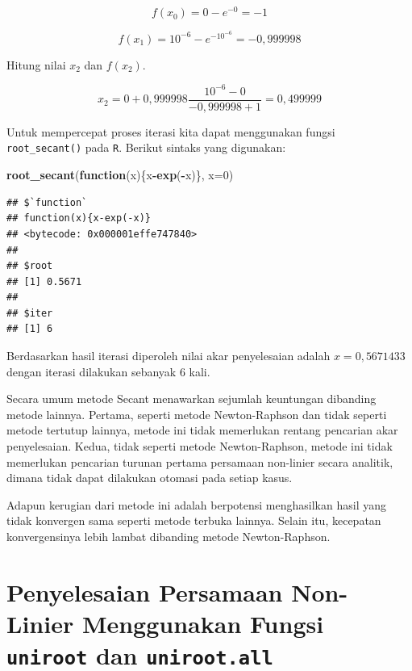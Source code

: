 \documentclass[
]{book}
\newenvironment{Shaded}{\begin{snugshade}}{\end{snugshade}}
\newcommand{\AttributeTok}[1]{\textcolor[rgb]{0.13,0.29,0.53}{#1}}
\newcommand{\ControlFlowTok}[1]{\textcolor[rgb]{0.13,0.29,0.53}{\textbf{#1}}}
\newcommand{\DecValTok}[1]{\textcolor[rgb]{0.00,0.00,0.81}{#1}}
\newcommand{\FunctionTok}[1]{\textcolor[rgb]{0.13,0.29,0.53}{\textbf{#1}}}
\newcommand{\NormalTok}[1]{#1}
\newcommand{\SpecialCharTok}[1]{\textcolor[rgb]{0.81,0.36,0.00}{\textbf{#1}}}
\theoremstyle{definition}
\theoremstyle{definition}
\theoremstyle{definition}
\theoremstyle{definition}
\theoremstyle{remark}
\begin{document}
\[
f\left(x_0 \right)=0-e^{-0}=-1
\]

\[
f\left(x_1 \right)=10^{-6}-e^{-10^{-6}}=-0,999998
\]

Hitung nilai \(x_2\) dan \(f\left(x_2 \right)\).

\[
x_2=0+0,999998\frac{10^{-6}-0}{-0,999998+1}=0,499999
\]

Untuk mempercepat proses iterasi kita dapat menggunakan fungsi \texttt{root\_secant()} pada \texttt{R}. Berikut sintaks yang digunakan:

\begin{Shaded}
\begin{Highlighting}[]
\FunctionTok{root\_secant}\NormalTok{(}\ControlFlowTok{function}\NormalTok{(x)\{x}\SpecialCharTok{{-}}\FunctionTok{exp}\NormalTok{(}\SpecialCharTok{{-}}\NormalTok{x)\}, }\AttributeTok{x=}\DecValTok{0}\NormalTok{)}
\end{Highlighting}
\end{Shaded}

\begin{verbatim}
## $`function`
## function(x){x-exp(-x)}
## <bytecode: 0x000001effe747840>
## 
## $root
## [1] 0.5671
## 
## $iter
## [1] 6
\end{verbatim}

Berdasarkan hasil iterasi diperoleh nilai akar penyelesaian adalah \(x=0,5671433\) dengan iterasi dilakukan sebanyak \(6\) kali.

Secara umum metode Secant menawarkan sejumlah keuntungan dibanding metode lainnya. Pertama, seperti metode Newton-Raphson dan tidak seperti metode tertutup lainnya, metode ini tidak memerlukan rentang pencarian akar penyelesaian. Kedua, tidak seperti metode Newton-Raphson, metode ini tidak memerlukan pencarian turunan pertama persamaan non-linier secara analitik, dimana tidak dapat dilakukan otomasi pada setiap kasus.

Adapun kerugian dari metode ini adalah berpotensi menghasilkan hasil yang tidak konvergen sama seperti metode terbuka lainnya. Selain itu, kecepatan konvergensinya lebih lambat dibanding metode Newton-Raphson.

\hypertarget{uniroot}{%
\section{\texorpdfstring{Penyelesaian Persamaan Non-Linier Menggunakan Fungsi \texttt{uniroot} dan \texttt{uniroot.all}}{Penyelesaian Persamaan Non-Linier Menggunakan Fungsi uniroot dan uniroot.all}}\label{uniroot}}
\end{document}
